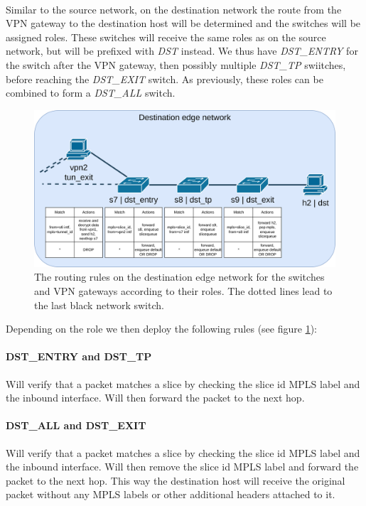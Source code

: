 \paragraph{} Similar to the source network, on the destination network the route from the VPN gateway to the destination host will be determined and the switches will be assigned roles. These switches will receive the same roles as on the source network, but will be prefixed with \textit{DST} instead. We thus have \textit{DST\_ENTRY} for the switch after the VPN gateway, then possibly multiple \textit{DST\_TP} swiitches, before reaching the \textit{DST\_EXIT} switch. As previously, these roles can be combined to form a \textit{DST\_ALL} switch.

\begin{figure}[ht]
  \centering
  \includegraphics[width=\linewidth]{images/chapter_6/routing_destination.png}
  \caption[Routing on the destination edge network]{The routing rules on the destination edge network for the switches and VPN gateways according to their roles. The dotted lines lead to the last black network switch.}
  \label{fig:routing_destination}
\end{figure}

Depending on the role we then deploy the following rules (see figure \ref{fig:routing_destination}):

\paragraph{DST\_ENTRY and DST\_TP} Will verify that a packet matches a slice by checking the slice id MPLS label and the inbound interface. Will then forward the packet to the next hop.

\paragraph{DST\_ALL and DST\_EXIT} Will verify that a packet matches a slice by checking the slice id MPLS label and the inbound interface. Will then remove the slice id MPLS label and forward the packet to the next hop. This way the destination host will receive the original packet without any MPLS labels or other additional headers attached to it.

